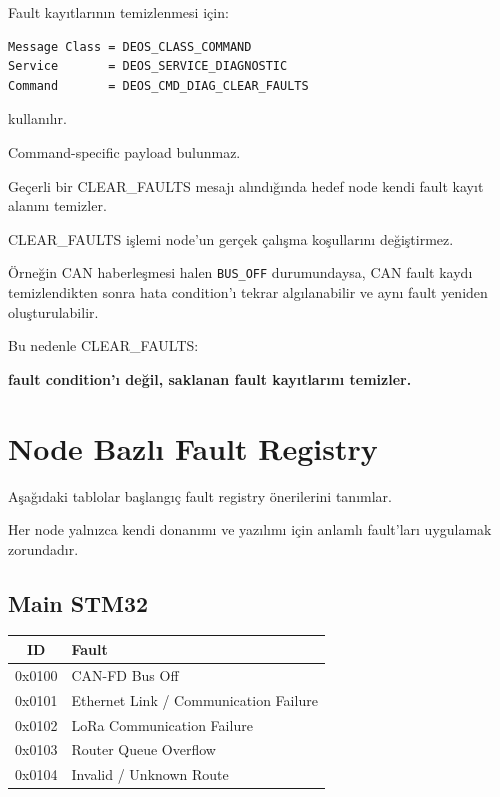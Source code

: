 \documentclass[a4paper,11pt]{article}
\begin{document}
Fault kayıtlarının temizlenmesi için:

\begin{lstlisting}
Message Class = DEOS_CLASS_COMMAND
Service       = DEOS_SERVICE_DIAGNOSTIC
Command       = DEOS_CMD_DIAG_CLEAR_FAULTS
\end{lstlisting}

kullanılır.

Command-specific payload bulunmaz.

Geçerli bir CLEAR\_FAULTS mesajı alındığında hedef node kendi fault
kayıt alanını temizler.

CLEAR\_FAULTS işlemi node'un gerçek çalışma koşullarını değiştirmez.

Örneğin CAN haberleşmesi halen \texttt{BUS\_OFF} durumundaysa,
CAN fault kaydı temizlendikten sonra hata condition'ı tekrar
algılanabilir ve aynı fault yeniden oluşturulabilir.

Bu nedenle CLEAR\_FAULTS:

\begin{center}
\textbf{fault condition'ı değil, saklanan fault kayıtlarını temizler.}
\end{center}

\section{Node Bazlı Fault Registry}

Aşağıdaki tablolar başlangıç fault registry önerilerini tanımlar.

Her node yalnızca kendi donanımı ve yazılımı için anlamlı fault'ları
uygulamak zorundadır.

\subsection{Main STM32}

\begin{center}
\begin{tabular}{c l}
\toprule
\textbf{ID} & \textbf{Fault} \\
\midrule
0x0100 & CAN-FD Bus Off \\
0x0101 & Ethernet Link / Communication Failure \\
0x0102 & LoRa Communication Failure \\
0x0103 & Router Queue Overflow \\
0x0104 & Invalid / Unknown Route \\
\bottomrule
\end{tabular}
\end{center}
\end{document}
